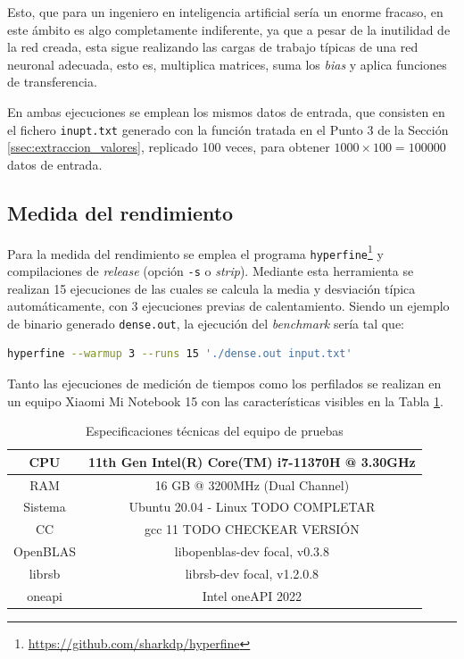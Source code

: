 Esto, que para un ingeniero en inteligencia artificial sería un enorme fracaso, en este ámbito es algo completamente indiferente, ya que a pesar de la inutilidad de la red creada, esta sigue realizando las cargas de trabajo típicas de una red neuronal adecuada, esto es, multiplica matrices, suma los \textit{bias} y aplica funciones de transferencia.

En ambas ejecuciones se emplean los mismos datos de entrada, que consisten en el fichero \texttt{inupt.txt} generado con la función tratada en el Punto 3 de la Sección \ref{ssec:extraccion_valores}, replicado 100 veces, para obtener $1000 \times 100 = 100000$ datos de entrada.

\subsection{Medida del rendimiento}
\label{ssec:medida_rendimiento_metodologia}
Para la medida del rendimiento se emplea el programa \texttt{hyperfine}\footnote{\url{https://github.com/sharkdp/hyperfine}} y compilaciones de \textit{release} (opción \texttt{-s} o \textit{strip}). Mediante esta herramienta se realizan 15 ejecuciones de las cuales se calcula la media y desviación típica automáticamente, con 3 ejecuciones previas de calentamiento. Siendo un ejemplo de binario generado \texttt{dense.out}, la ejecución del \textit{benchmark} sería tal que:\medskip
\begin{lstlisting}[language=bash]
hyperfine --warmup 3 --runs 15 './dense.out input.txt'
\end{lstlisting}

Tanto las ejecuciones de medición de tiempos como los perfilados se realizan en un equipo Xiaomi Mi Notebook 15 con las características visibles en la Tabla \ref{tb:especificaciones_xiaomi}.
\begin{table}
\centering
\begin{tabular}{|c|c|}
    \hline
    CPU & 11th Gen Intel(R) Core(TM) i7-11370H @ 3.30GHz\\\hline
    RAM & 16 GB @ 3200MHz (Dual Channel)\\\hline
    Sistema & Ubuntu 20.04 - Linux TODO COMPLETAR\\\hline
    CC & gcc 11 TODO CHECKEAR VERSIÓN\\\hline
    OpenBLAS & libopenblas-dev focal, v0.3.8\\\hline
    librsb & librsb-dev focal, v1.2.0.8\\\hline
    oneapi & Intel oneAPI 2022\\\hline
\end{tabular}
\caption{\label{tb:especificaciones_xiaomi}Especificaciones técnicas del equipo de pruebas}
\end{table}


